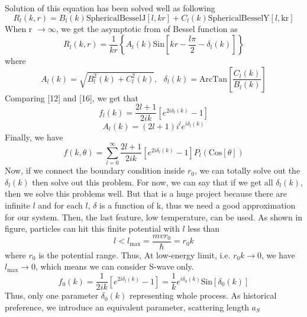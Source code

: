 Solution of this equation has been solved well as following
\begin{equation}
R_l(k,r)=B_l(k)\text{SphericalBesselJ}[l,kr]+C_l(k)\text{SphericalBesselY}[l,\text{kr}]
\end{equation}
When r $\to \infty $, we get the asymptotic from of Bessel function as
\begin{equation}
R_l(k,r)=\frac{1}{k r}\left\{A_l(k)\text{Sin}\left[k r-\frac{l \pi }{2}-\delta _l(k)\right]\right\}
\end{equation}
where
\begin{equation}
A_l(k)=\sqrt{B_l^2(k)+C_l^2(k)},\text{  }\delta _l(k)=\text{ArcTan}\left[\frac{C_l(k)}{B_l(k)}\right]
\end{equation}
Comparing [12] and [16], we get that
\begin{equation}
f_l(k)=\frac{2l+1}{2i k}\left[e^{2i \delta _l(k)}-1\right]
\end{equation}
\begin{equation}
A_l(k)=(2l+1)i^le^{i \delta _l(k)}
\end{equation}
Finally, we have
\begin{equation}
f(k,\theta )=\sum _{l =0}^{\infty } \frac{2l+1}{2i k}\left[e^{2i \delta _l(k)}-1\right]P_l(\text{Cos}[\theta ])
\end{equation}
Now, if we connect the boundary condition inside $r_0$, we can totally solve out the $\delta _l(k)$ then solve out this problem.
For now, we can say that if we get all $\delta _l(k)$, then we solve this problems well. But that is a huge project because there are infinite $l$ and for each $l$, $\delta$ is a function of k, thus we need a good approximation for our system. Then, the last feature, low temperature, can be used. 
As shown in figure, particles can hit this finite potential with $l$ less than 
\begin{equation}
l<l_{\max }=\frac{m v r_0}{\hbar }=r_0 k
\end{equation}
where $r_0$ is the potential range. Thus, At low-energy limit, i.e. $r_0k\to 0$, we have $l_{\max }\to 0$, which means we can consider S-wave only.
\begin{equation}
f_0(k)=\frac{1}{2ik}\left[e^{2i\delta_l(k)}-1\right]=\frac{1}{k}e^{i \delta _0(k)}\text{Sin}\left[\delta _0(k)\right]
\end{equation}
Thus, only one parameter $\delta _0(k)$ representing whole process. As historical preference, we introduce an equivalent parameter, scattering length $a_S$
